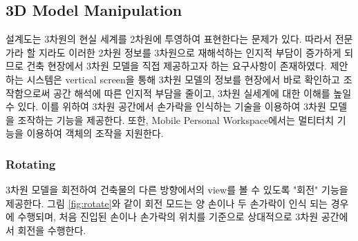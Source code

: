 \subsection{3D Model Manipulation}

설계도는 3차원의 현실 세계를 2차원에 투영하여 표현한다는 문제가 있다. 따라서 전문가라 할 지라도 이러한 2차원 정보를 3차원으로 재해석하는 인지적 부담이 증가하게 되므로 건축 현장에서 3차원 모델을 직접 제공하고자 하는 요구사항이 존재하였다. 제안하는 시스템은 vertical screen을 통해 3차원 모델의 정보를 현장에서 바로 확인하고 조작함으로써 공간 해석에 따른 인지적 부담을 줄이고, 3차원 실세계에 대한 이해를 높일 수 있다. 이를 위하여 3차원 공간에서 손가락을 인식하는 기술을 이용하여 3차원 모델을 조작하는 기능을 제공한다. 또한, Mobile Personal Workspace에서는 멀티터치 기능을 이용하여 객체의 조작을 지원한다.



\subsubsection{Rotating}
3차원 모델을 회전하여 건축물의 다른 방향에서의 view를 볼 수 있도록 "회전" 기능을 제공한다. 그림 \ref{fig:rotate}와 같이 회전 모드는 양 손이나 두 손가락이 인식 되는 경우에 수행되며, 처음 진입된 손이나 손가락의 위치를 기준으로 상대적으로 3차원 공간에서 회전을 수행한다.

